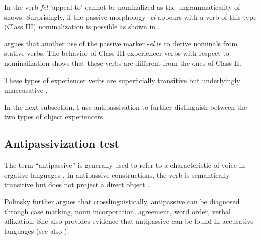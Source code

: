 \documentclass[output=paper]{langscibook}
\begin{document}
In  the verb \textit{fel} ‘appeal to’ cannot be nominalized as the ungrammaticality of   shows. Surprisingly, if the passive morphology -\textit{el} appears with a verb of this type (Class III) nominalization is possible as shown in .

\ea \label{ex:tamba:18}
\z
\z

\citet{Faye2013} argues that another use of the passive marker -\textit{el}  is to derive nominals from stative verbs. The behavior of Class III experiencer verbs with respect to nominalization  shows that these verbs are different from the ones of Class II. 

These types of experiencer verbs are superficially transitive but underlyingly unaccusative \citep{Belletti1988, Pesetsky1995, Landau2010}.  

In the next subsection, I use antipassivation to further distinguish between the two types of object experiencers.

\subsection{Antipassivization test}

The term “antipassive” is generally used to refer to a characteristic of voice in ergative languages \citep{Crystal2008}. In antipassive constructions, the verb is semantically transitive but does not project a direct object \citep{Polinsky2017}. 

Polinsky further argues that crosslinguistically, antipassive can be diagnosed through case marking, noun incorporation, agreement, word order, verbal affixation. She also provides evidence that antipassive can be found in accusative languages (see also \citealt{Heaton2017}). 
\end{document}
